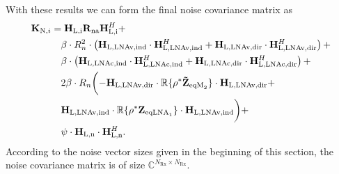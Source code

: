 With these results we can form the final noise covariance matrix as 
\begin{align}
\label{eq:noise_cov}\nonumber
\mat{K}_{\text{N},i}%
&=\mat{H}_\text{L,i} \mat{R}_\text{na} \mat{H}_\text{L,i}^H+\\\nonumber
&\quad	\beta \cdot R_n^2\cdot \left(\mat{H}_\text{L,LNAv,ind}\cdot\mat{H}_\text{L,LNAv,ind}^H+
	\mat{H}_\text{L,LNAv,dir}\cdot\mat{H}_\text{L,LNAv,dir}^H\right)+\\\nonumber
&\quad	\beta \cdot \left(\mat{H}_\text{L,LNAc,ind}\cdot\mat{H}_\text{L,LNAc,ind}^H+
	\mat{H}_\text{L,LNAc,dir}\cdot\mat{H}_\text{L,LNAc,dir}^H\right)+\\\nonumber
&\quad	2\beta \cdot R_n\biggl(
	-\mat{H}_\text{L,LNAv,dir} \cdot\mathbb{R}\{\rho^*\mat{\tilde{Z}}_{\text{eqM}_2}\}\cdot
	\mat{H}_\text{L,LNAv,dir}+\\\nonumber
&\quad	\mat{H}_\text{L,LNAv,ind} \cdot\mathbb{R}\{\rho^*\mat{Z}_{\text{eqLNA}_1}\}\cdot
	\mat{H}_\text{L,LNAv,ind}\biggr)+\\
&\quad	\psi\cdot\mat{H}_\text{L,n}\cdot\mat{H}_\text{L,n}^H.
\end{align}
According to the noise vector sizes given in the beginning of this section, the noise covariance matrix is of size $\mathbb{C}^{N_\text{Rx}\times N_\text{Rx}}$.









